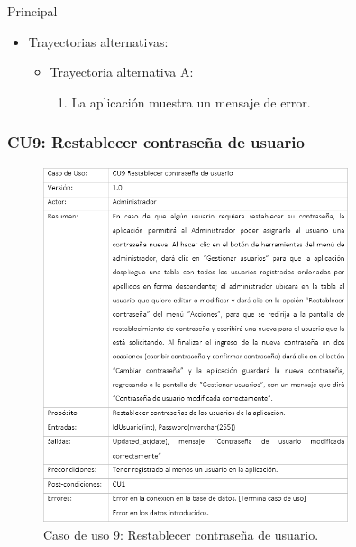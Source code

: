 \begin{UCtrayectoria}{Principal}
\begin{itemize}
\begin{enumerate}
					\end{enumerate}
				\item Trayectorias alternativas:
					\begin{itemize}
						\item Trayectoria alternativa A:
							\begin{enumerate}
								\item La aplicación muestra un mensaje de error.
							\end{enumerate}
					\end{itemize}
			\end{itemize}

\newpage
			
		\subsubsection{CU9: Restablecer contraseña de usuario}
			\begin{figure}[htbp!]
				\centering
					\includegraphics[width=0.8\textwidth]{images/CU/CU9}
					\caption{Caso de uso 9: Restablecer contraseña de usuario.}
				\label{Tabla}
			\end{figure}
			

\end{UCtrayectoria}
